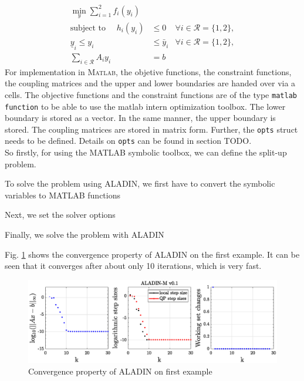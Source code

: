 \documentclass[]{scrartcl}
\begin{document}
\begin{subequations} \label{eq:sepForm_example}
    \begin{align} 
    \min_{y} \sum_{i=1}^2  f_i(y_i)& \\
    \text{subject to }\quad  h_i(y_i)&\leq 0&\forall i \in \mathcal{R} = \{1, 2\}, \label{sepFormInEq_example} \\
    \underline y_i \leq y_i& \leq \bar y_i &\forall i \in \mathcal{R} = \{1, 2\}, \label{sepFormBound_example}\\
    \sum_{i\in \mathcal{R}} A_i y_i&=b \label{eq:consConstr_example}
    \end{align}
\end{subequations}
For implementation in \textsc{Matlab}, the objetive functions, the constraint functions, the coupling matrices and the upper and lower boundaries are handed over via a cells. The objective functions and the constraint functions are of the type \texttt{matlab function} to be able to use the matlab intern optimization toolbox. The lower boundary is stored as a vector. In the same manner, the upper boundary is stored. The coupling matrices are stored in matrix form. Further, the \texttt{opts} struct needs to be defined. Details on \texttt{opts} can be found in section TODO.
\\So firstly, for using the MATLAB symbolic toolbox, we can define the split-up problem.

To solve the problem using ALADIN, we first have to convert the symbolic variables to MATLAB functions

Next, we set the solver options

Finally, we solve the problem with ALADIN

Fig. \ref{fig:example_main} shows the convergence property of ALADIN on the first example. It can be seen that it converges after about only 10 iterations, which is very fast.

\begin{figure}
	\centering
	\includegraphics[width=1\linewidth]{figures/example_main.eps}
	\caption{Convergence property of ALADIN on first example}
	\label{fig:example_main}
\end{figure}
\end{document}
